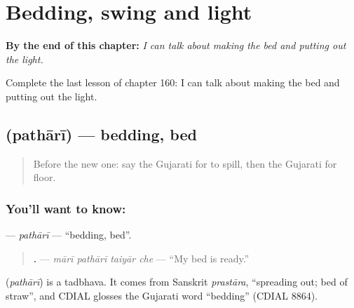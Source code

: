 
\chapter{Bedding, swing and light}
\label{ch:gu-bedding-swing-and-light}

\begin{chapteropening}
\textbf{By the end of this chapter:} \emph{I can talk about making the bed and putting out the light.}

Complete the last lesson of chapter 160: I can talk about making the bed and putting out the light.
\end{chapteropening}

\section[\texorpdfstring{\gu{પથારી} (pathārī)}{પથારી (pathārī)}]{ (pathārī) — bedding, bed}

\label{lesson:GU-C160-pathari}



\begin{quote}
Before the new one: say the Gujarati for to spill, then the Gujarati for floor.
\end{quote}

\subsection*{You'll want to know: }
\textbf{} — \emph{pathārī} — \textquotedblleft{}bedding, bed\textquotedblright{}.

\begin{quote}
\textbf{   .} — \emph{mārī pathārī taiyār che} — \textquotedblleft{}My bed is ready.\textquotedblright{}
\end{quote}

\begin{cousinweb}
\textbf{} (\emph{pathārī}) is a tadbhava. It comes from Sanskrit \emph{prastāra}, \textquotedblleft{}spreading out; bed of straw\textquotedblright{}, and CDIAL glosses the Gujarati word \textquotedblleft{}bedding\textquotedblright{} (CDIAL 8864).
\end{cousinweb}

